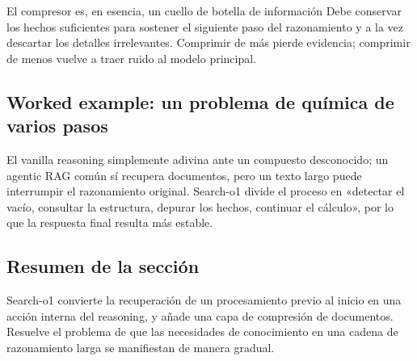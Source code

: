 
\begin{knowledgebox}{El compresor es, en esencia, un cuello de botella de información}
Debe conservar los hechos suficientes para sostener el siguiente paso del razonamiento y a la vez descartar los detalles irrelevantes. Comprimir de más pierde evidencia; comprimir de menos vuelve a traer ruido al modelo principal.
\end{knowledgebox}

\subsection{Worked example: un problema de química de varios pasos}


El vanilla reasoning simplemente adivina ante un compuesto desconocido; un agentic RAG común sí recupera documentos, pero un texto largo puede interrumpir el razonamiento original. Search-o1 divide el proceso en «detectar el vacío, consultar la estructura, depurar los hechos, continuar el cálculo», por lo que la respuesta final resulta más estable.

\subsection{Resumen de la sección}

Search-o1 convierte la recuperación de un procesamiento previo al inicio en una acción interna del reasoning, y añade una capa de compresión de documentos. Resuelve el problema de que las necesidades de conocimiento en una cadena de razonamiento larga se manifiestan de manera gradual.
